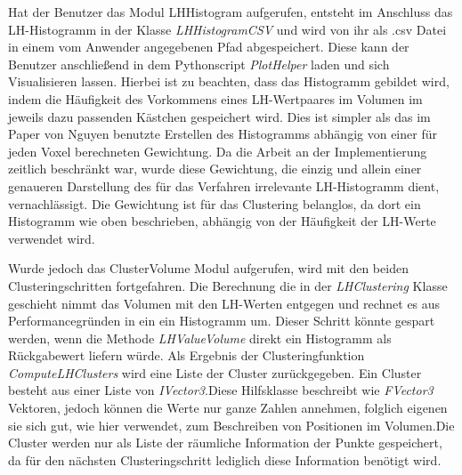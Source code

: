 Hat der Benutzer das Modul LHHistogram aufgerufen, entsteht im Anschluss das LH-Histogramm in der Klasse \textit{LHHistogramCSV} und wird von ihr als .csv Datei in einem vom Anwender angegebenen Pfad abgespeichert. Diese kann der Benutzer anschließend in dem Pythonscript \textit{PlotHelper}  laden und sich Visualisieren lassen. Hierbei ist zu beachten, dass das Histogramm gebildet wird, indem die Häufigkeit des Vorkommens eines LH-Wertpaares im Volumen im jeweils dazu passenden Kästchen gespeichert wird. Dies ist simpler als das im Paper von Nguyen \cite{nguyen2012clustering} benutzte Erstellen des Histogramms abhängig von einer für jeden Voxel berechneten Gewichtung. Da die Arbeit an der Implementierung zeitlich beschränkt war, wurde diese Gewichtung, die einzig und allein einer genaueren Darstellung des für das Verfahren irrelevante LH-Histogramm dient, vernachlässigt. Die Gewichtung ist für das Clustering belanglos, da dort ein Histogramm wie oben beschrieben, abhängig von der Häufigkeit der LH-Werte verwendet wird. 


Wurde jedoch das ClusterVolume Modul aufgerufen, wird mit den beiden Clusteringschritten fortgefahren.
Die Berechnung die in der \textit{LHClustering} Klasse geschieht nimmt das Volumen mit den LH-Werten entgegen und rechnet es aus Performancegründen in ein ein Histogramm um. Dieser Schritt könnte gespart werden, wenn die Methode \textit{LHValueVolume} direkt ein Histogramm als Rückgabewert liefern würde. Als Ergebnis der Clusteringfunktion \textit{ComputeLHClusters} wird eine Liste der Cluster zurückgegeben. Ein Cluster besteht aus einer Liste von \textit{IVector3}.Diese Hilfsklasse beschreibt wie \textit{FVector3} Vektoren, jedoch können die Werte nur ganze Zahlen annehmen, folglich eigenen sie sich gut, wie hier verwendet, zum Beschreiben von Positionen im Volumen.Die Cluster werden nur als Liste der räumliche Information der Punkte gespeichert, da für den nächsten Clusteringschritt  lediglich diese Information benötigt wird. 